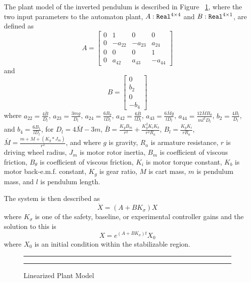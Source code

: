 \documentclass[conference]{IEEEtran}
\begin{document}
The plant model of the inverted pendulum is described in Figure ~\ref{fig:plant}, where the two input parameters to the automaton plant, $A:{\operatorname{\texttt{Real}}}^{4\times 4}$ and $B:{\operatorname{\texttt{Real}}}^{4\times 1}$, are defined as 
\begin{equation}
A=\left[ \begin{array}{cccc} 0 & 1 & 0 & 0 \\ 0 & -a_{22} & -a_{23} & a_{24} \\ 0 & 0 & 0 & 1 \\ 0 & a_{42} & a_{43} & -a_{44} \end{array} \right]
\label{eq:systemMatrix}
\end{equation}
and
\begin{equation}
B=\left[ \begin{array}{c} 0 \\ b_{2} \\ 0 \\ -b_{4} \end{array} \right]
\label{eq:inputMatrix}
\end{equation} where $a_{22}=\frac{4\bar{B}}{D_l}$, $a_{23}=\frac{3mg}{D_l}$, $a_{24}=\frac{6B_{\theta}}{lD_l}$, $a_{42}=\frac{6\bar{B}}{lD_l}$, $a_{43}=\frac{6\bar{M}g}{lD_l}$, $a_{44}=\frac{12\bar{M}B_{\theta}}{ml^2D_l}$, 
$b_2=\frac{4B_l}{D_l}$, and $b_4=\frac{6B_1}{lD_l}$, 
for $D_l=4\bar{M}-3m$, 
$\bar{B}=\frac{K_gB_m}{r^2}+\frac{K_g^2K_iK_b}{r^2R_a}$, 
$B_l=\frac{K_gK_i}{rR_a}$,
$\bar{M}=\frac{m+M+(K_g*J_m)}{r^2}$, and where  
$g$ is gravity,
$R_a$ is armature resistance,
$r$ is driving wheel radius,
$J_m$ is motor rotor inertia,
$B_m$ is coefficient of viscous friction,
$B_{\theta}$ is coefficient of viscous friction,
$K_i$ is motor torque constant,
$K_b$ is motor back-e.m.f. constant,
$K_g$ is gear ratio,
$M$ is cart mass, 
$m$ is pendulum mass, and
$l$ is pendulum length.

The system is then described as 
\begin{equation}
\dot{X}=\left(A+BK_{\sigma}\right)X
\label{eq:linearStateFeedbackDiffEq}
\end{equation} where $K_{\sigma}$ is one of the safety, baseline, or experimental controller gains and the solution to this is 
\begin{equation}
X=e^{\left(A+BK_{\sigma}\right)t}X_{0}
\label{eq:linearStateFeedbackSolution}
\end{equation} where $X_0$ is an initial condition within the stabilizable region.

\begin{figure}[h!]
\centering
  \hrule
  {}
  \hrule
  \caption{Linearized Plant Model}
  \label{fig:plant}
\end{figure}
\end{document}
